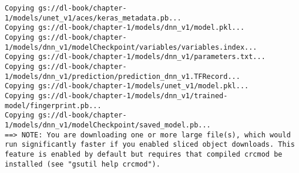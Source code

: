 \documentclass[
  letterpaper,
  DIV=11,
  numbers=noendperiod]{scrreprt}
\begin{document}
\begin{verbatim}
Copying gs://dl-book/chapter-1/models/unet_v1/aces/keras_metadata.pb...         
Copying gs://dl-book/chapter-1/models/dnn_v1/model.pkl...                       
Copying gs://dl-book/chapter-1/models/dnn_v1/modelCheckpoint/variables/variables.index...
Copying gs://dl-book/chapter-1/models/dnn_v1/parameters.txt...                  
Copying gs://dl-book/chapter-1/models/dnn_v1/prediction/prediction_dnn_v1.TFRecord...
Copying gs://dl-book/chapter-1/models/unet_v1/model.pkl...
Copying gs://dl-book/chapter-1/models/dnn_v1/trained-model/fingerprint.pb...
Copying gs://dl-book/chapter-1/models/dnn_v1/modelCheckpoint/saved_model.pb...  
==> NOTE: You are downloading one or more large file(s), which would            
run significantly faster if you enabled sliced object downloads. This
feature is enabled by default but requires that compiled crcmod be
installed (see "gsutil help crcmod").


\end{verbatim}
\end{document}
